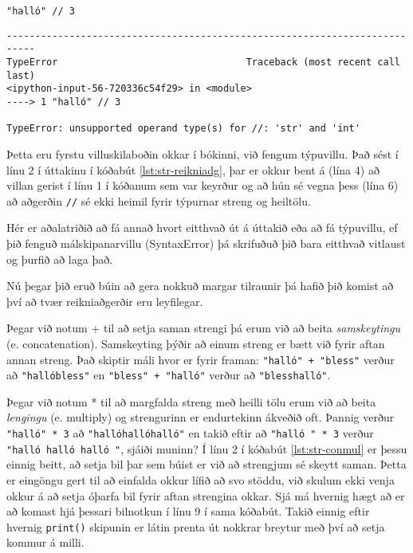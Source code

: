 \begin{lstlisting}[caption=Strengir og reikniaðgerðir, label=lst:str-reikniadg]
"halló" // 3
\end{lstlisting}
\lstset{style=uttak}
\begin{lstlisting}
---------------------------------------------------------------------------
TypeError                                 Traceback (most recent call last)
<ipython-input-56-720336c54f29> in <module>
----> 1 "halló" // 3

TypeError: unsupported operand type(s) for //: 'str' and 'int'
\end{lstlisting}
\lstset{style=venjulegt}

Þetta eru fyrstu villuskilaboðin okkar í bókinni, við fengum týpuvillu.
Það sést í línu 2 í úttakinu í kóðabút \ref{lst:str-reikniadg}, þar er okkur bent á (lína 4) að villan gerist í línu 1 í kóðanum sem var keyrður og að hún sé vegna þess (lína 6) að aðgerðin \texttt{//} sé ekki heimil fyrir týpurnar streng og heiltölu.

Hér er aðalatriðið að fá annað hvort eitthvað út á úttakið eða að fá týpuvillu, ef þið fenguð málskipanarvillu (SyntaxError) þá skrifuðuð þið bara eitthvað vitlaust og þurfið að laga það.


Nú þegar þið eruð búin að gera nokkuð margar tilraunir þá hafið þið komist að því að tvær reikniaðgerðir eru leyfilegar.

Þegar við notum + til að setja saman strengi þá erum við að beita \textit{samskeytingu} (e. concatenation).
Samskeyting þýðir að einum streng er bætt við fyrir aftan annan streng.
Það skiptir máli hvor er fyrir framan: \texttt{"halló" + "bless"} verður að \texttt{"hallóbless"} en \texttt{"bless" + "halló"} verður að \texttt{"blesshalló"}.

Þegar við notum * til að margfalda streng með heilli tölu erum við að beita \emph{lengingu} (e. multiply) og strengurinn er endurtekinn ákveðið oft.
Þannig verður \texttt{"halló" * 3} að \texttt{"hallóhallóhalló"} en takið eftir að \texttt{"halló " * 3} verður \texttt{"halló halló halló "}, sjáiði muninn?
Í línu 2 í kóðabút \ref{lst:str-conmul} er þessu einnig beitt, að setja bil þar sem búist er við að strengjum sé skeytt saman.
Þetta er eingöngu gert til að einfalda okkur lífið að svo stöddu, við skulum ekki venja okkur á að setja óþarfa bil fyrir aftan strengina okkar.
Sjá má hvernig hægt að er að komast hjá þessari bilnotkun í línu 9 í sama kóðabút.
Takið einnig eftir hvernig \texttt{print()} skipunin er látin prenta út nokkrar breytur með því að setja kommur á milli.

